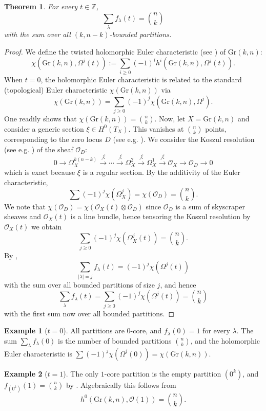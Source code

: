 \documentclass{amsart}
\newcommand{\iprod}{\mathbin{\lrcorner}}
\theoremstyle{plain}
\newtheorem{theorem}{Theorem}[section]
\theoremstyle{definition}
\newtheorem{example}[example]{Example}
\numberwithin{equation}{section}
\begin{document}
\begin{theorem}
\label{thm: euler characteristic hook length}
For every $t\in\mathbb{Z}$,
\[\sum_\lambda f_\lambda(t)=\binom{n}{k}\]
with the sum over all $(k,n-k)$-bounded partitions.
\end{theorem}
\begin{proof}
We define the twisted holomorphic Euler characteristic (see \cite[\S2.10]{Hir78}) of $\text{Gr}(k,n)$:
\[\chi(\text{Gr}(k,n),\Omega^j(t)) := \sum_{i\geq 0}(-1)^ih^i(\text{Gr}(k,n),\Omega^j(t)).\]
When $t=0$, the holomorphic Euler characteristic is related to the standard (topological) Euler characteristic $\chi(\text{Gr}(k,n))$ via 
\[\chi(\text{Gr}(k,n)) = \sum_{j\geq 0}(-1)^j \chi(\text{Gr}(k,n),\Omega^j).\]
One readily shows that $\chi(\text{Gr}(k,n)) = \binom{n}{k}$.
Now, let $X=\text{Gr}(k,n)$ and consider a generic section $\xi\in H^0(T_{X})$. This vanishes at $\binom{n}{k}$ points, corresponding to the zero locus $D$ (see e.g. \cite[\S14.1]{Ful84}). We consider the Koszul resolution (see e.g. \cite[\S17.2]{Eis95}) of the sheaf $\mathcal O_D$:
\[0\to\Omega_X^{k(n-k)} \xrightarrow{\iprod \xi}\cdots \xrightarrow{\iprod \xi} \Omega_X^2\xrightarrow{\iprod \xi}\Omega_X^1 \xrightarrow{\iprod \xi}\mathcal O_X \xrightarrow{} \mathcal O_{D}\to 0\]
which is exact because $\xi$ is a regular section. By the additivity of the Euler characteristic,
\[\sum(-1)^{j}\chi(\Omega_X^j) = \chi (\mathcal O_{D}) = \binom{n}{k}.\]
We note that $\chi (\mathcal O_{D}) = \chi(\mathcal O_X(t)\otimes \mathcal O_D)$ since $\mathcal O_D$ is a sum of skyscraper sheaves and $\mathcal O_X(t)$ is a line bundle, hence tensoring the Koszul resolution by $\mathcal O_X(t)$ we obtain
\[\sum_{j\geq 0}(-1)^{j}\chi(\Omega_X^j(t))=\binom{n}{k}.\]
By ,
\[\sum_{|\lambda|=j} f_\lambda(t)=(-1)^j\chi(\Omega^j(t))\]
with the sum over all bounded partitions of size $j$, and hence
\[\sum_\lambda f_\lambda(t)=\sum_{j\geq 0}(-1)^j\chi(\Omega^j(t))=\binom{n}{k}\]
with the first sum now over all bounded partitions.
\end{proof}

\begin{example}[$t=0$]
    All partitions are $0$-core, and $f_\lambda(0)=1$ for every $\lambda$. The sum $\sum_\lambda f_\lambda(0)$ is the number of bounded partitions $\binom n k$, and the holomorphic Euler characteristic is $\sum (-1)^j\chi(\Omega^j(0))=\chi(\mathrm{Gr}(k,n))$.
\end{example}

\begin{example}[$t=1$]
    The only $1$-core partition is the empty partition $(0^k)$, and $f_{(0^k)}(1)=\binom{n}{k}$ by . Algebraically this follows from
\[h^0(\text{Gr}(k,n),\mathcal O(1))=\binom{n}{k}.\]
\end{example}
\end{document}
